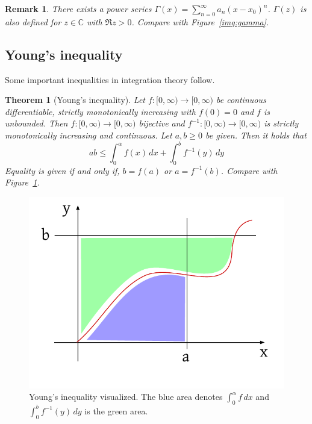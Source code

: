 \documentclass{article}
\newtheorem{theorem}{Theorem}  \numberwithin{theorem}{section}
\newtheorem{remark}{Remark}  \numberwithin{remark}{section}
\begin{document}
\begin{remark}
  There exists a power series $\Gamma(x) = \sum_{n=0}^\infty a_n (x - x_0)^n$.
  $\Gamma(z)$ is also defined for $z \in \mathbb C$ with $\Re{z} > 0$.
  Compare with Figure~\ref{img:gamma}.
\end{remark}

\subsection{Young's inequality}

Some important inequalities in integration theory follow.

\begin{theorem}[Young's inequality] %
  Let $f: [0, \infty) \to [0,\infty)$ be continuous differentiable, strictly monotonically increasing with $f(0) = 0$ and $f$ is unbounded.
  Then $f: [0, \infty) \to [0,\infty)$ bijective and $f^{-1}: [0,\infty) \to [0,\infty)$ is strictly monotonically increasing and continuous.
  Let $a, b \geq 0$ be given. Then it holds that
  \[ ab \leq \int_0^\alpha f(x) \, dx + \int_0^b f^{-1}(y) \, dy \]
  Equality is given if and only if, $b = f(a)$ or $a = f^{-1}(b)$.
  Compare with Figure~\ref{img:young}.
\end{theorem}

\begin{figure}[t]
  \begin{center}
    \includegraphics{img/23_young.pdf}
    \caption{Young's inequality visualized. The blue area denotes $\int_0^\alpha f \, dx$ and $\int_0^b f^{-1}(y) \, dy$ is the green area.}
    \label{img:young}
  \end{center}
\end{figure}
\end{document}
